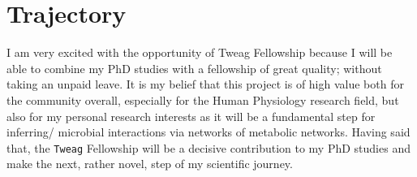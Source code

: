 \documentclass[a4paper, 12pt]{article}
\def\volesti{{\tt volesti}}
\begin{document}


\section{Trajectory}
I am very excited with the opportunity of Tweag Fellowship because I will be able to combine my PhD studies with a fellowship of great quality;
without taking an unpaid leave. It is my belief that this project is of high value both for the community overall, especially for the Human Physiology research field, but also for my personal research interests as it will be a fundamental step for inferring/ microbial interactions via networks of metabolic networks. Having said that, the {\tt Tweag} Fellowship will be a decisive contribution to my PhD studies and make the next, rather novel, step of my scientific journey.
\end{document}
